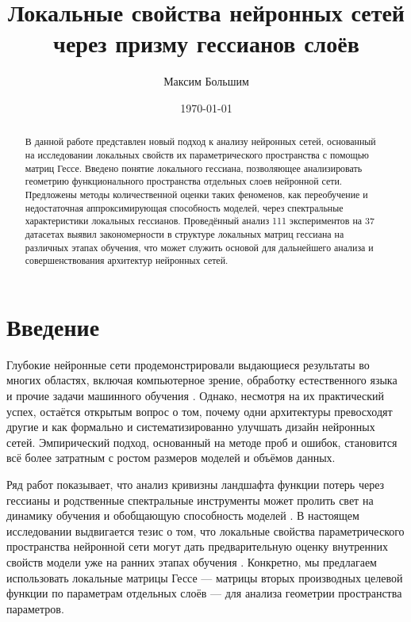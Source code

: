 \documentclass[a4paper,12pt]{article}
\title{Локальные свойства нейронных сетей через призму гессианов слоёв}
\author{Максим Большим}
\date{\today}
\begin{document}
\maketitle

\begin{abstract}
  В данной работе представлен новый подход к анализу нейронных сетей, основанный на исследовании локальных
  свойств их параметрического пространства с помощью матриц Гессе. Введено понятие локального гессиана,
  позволяющее анализировать геометрию функционального пространства отдельных слоев нейронной сети. Предложены
  методы количественной оценки таких феноменов, как переобучение и недостаточная аппроксимирующая способность
  моделей, через спектральные характеристики локальных гессианов. Проведённый анализ 111 экспериментов на 37
  датасетах выявил закономерности в структуре локальных матриц гессиана на различных этапах обучения,
  что может служить основой для дальнейшего анализа и совершенствования архитектур нейронных сетей.
\end{abstract}

\section{Введение}

Глубокие нейронные сети продемонстрировали выдающиеся результаты во многих областях, включая компьютерное
зрение, обработку естественного языка и прочие задачи машинного обучения \cite{lecun2015deep,
goodfellow2016deep}. Однако, несмотря на их практический успех, остаётся открытым вопрос о том, почему одни
архитектуры превосходят другие и как формально и систематизированно улучшать дизайн нейронных сетей.
Эмпирический подход, основанный на методе проб и ошибок, становится всё более затратным с ростом размеров
моделей и объёмов данных.

Ряд работ показывает, что анализ кривизны ландшафта функции потерь через гессианы и родственные спектральные
инструменты может пролить свет на динамику обучения и обобщающую способность моделей
\cite{sagun2017empirical, maheswaranathan2019universality, lee2019wide, arora2019finegrained}. В настоящем
исследовании выдвигается тезис о том, что локальные свойства параметрического пространства нейронной сети
могут дать предварительную оценку внутренних свойств модели уже на ранних этапах обучения
\cite{poole2016transient}. Конкретно, мы предлагаем использовать локальные матрицы Гессе — матрицы вторых
производных целевой функции по параметрам отдельных слоёв — для анализа геометрии пространства параметров.
\end{document}
